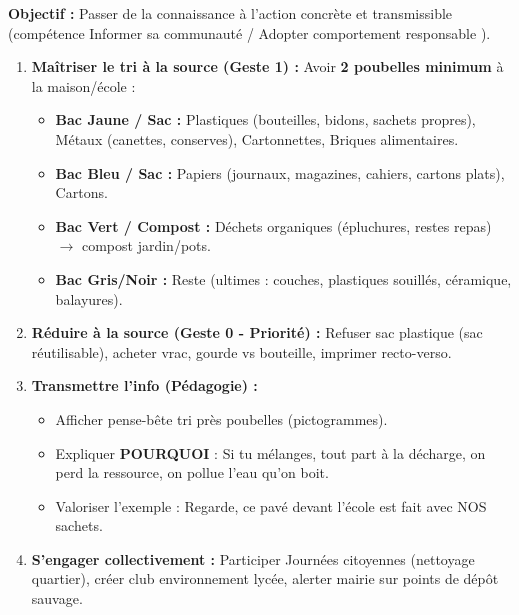 \documentclass[11pt]{article}
\newcommand{\cle}[1]{{\popxbold\color{popdark}#1}}
\begin{document}
\begin{methode}
\textbf{Objectif :} Passer de la connaissance à l'action concrète et transmissible (compétence \og Informer sa communauté \fg{} / \og Adopter comportement responsable \fg{}).
\begin{enumerate}
    \item \textbf{Maîtriser le tri à la source (Geste 1) :} Avoir \textbf{2 poubelles minimum} à la maison/école :
    \begin{itemize}
        \item \textbf{Bac Jaune / Sac :} Plastiques (bouteilles, bidons, sachets propres), Métaux (canettes, conserves), Cartonnettes, Briques alimentaires.
        \item \textbf{Bac Bleu / Sac :} Papiers (journaux, magazines, cahiers, cartons plats), Cartons.
        \item \textbf{Bac Vert / Compost :} Déchets organiques (épluchures, restes repas) $\rightarrow$ compost jardin/pots.
        \item \textbf{Bac Gris/Noir :} Reste (ultimes : couches, plastiques souillés, céramique, balayures).
    \end{itemize}
    \item \textbf{Réduire à la source (Geste 0 - Priorité) :} Refuser sac plastique (sac réutilisable), acheter vrac, gourde vs bouteille, imprimer recto-verso.
    \item \textbf{Transmettre l'info (Pédagogie) :}
    \begin{itemize}
        \item Afficher pense-bête tri près poubelles (pictogrammes).
        \item Expliquer \textbf{POURQUOI} : \og Si tu mélanges, tout part à la décharge, on perd la ressource, on pollue l'eau qu'on boit.\fg{}
        \item Valoriser l'exemple : \og Regarde, ce pavé devant l'école est fait avec NOS sachets.\fg{}
    \end{itemize}
    \item \textbf{S'engager collectivement :} Participer \cle{Journées citoyennes} (nettoyage quartier), créer club environnement lycée, alerter mairie sur points de dépôt sauvage.
\end{enumerate}
\end{methode}
\end{document}
